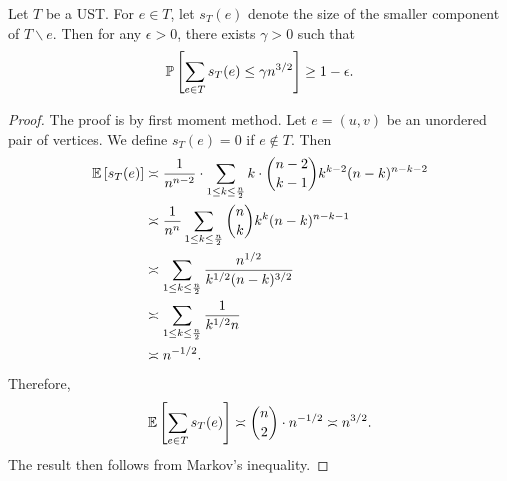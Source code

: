 \begin{lemma} \label{lem:conn:ust-structure-3}
  Let $T$ be a UST.
  For $e\in T$, let $s_T(e)$ denote the size of the smaller component of $T\backslash e$.
  Then for any $\epsilon>0$, there exists $\gamma>0$ such that
  \begin{align*}
    \mathbb{P}\left[ \sum_{e\in T} s_T(e) \le \gamma n^{3/2} \right] \ge 1-\epsilon.
  \end{align*}
\end{lemma}
\begin{proof}
  The proof is by first moment method.
  Let $e=(u,v)$ be an unordered pair of vertices.
  We define $s_T(e)=0$ if $e\not \in T$.
  Then
  \begin{align*}
    \mathbb{E} \left[s_T(e)\right] &\asymp \frac 1{n^{n-2}} \cdot \sum_{1\le k\le \frac n2} k \cdot \binom{n-2}{k-1} k^{k-2} (n-k)^{n-k-2} \\
    \nonumber &\asymp \frac 1{n^n} \sum_{1\le k\le \frac n2} \binom nk k^k (n-k)^{n-k-1} \\
    \nonumber &\asymp \sum_{1\le k\le \frac n2} \frac{n^{1/2}}{k^{1/2} (n-k)^{3/2}} \\
    \nonumber &\asymp \sum_{1\le k\le \frac n2} \frac{1}{k^{1/2} n} \\
    \nonumber &\asymp n^{-1/2}.
  \end{align*}
  Therefore,
  \begin{align*}
    \mathbb{E}\left[ \sum_{e\in T} s_T(e)\right] \asymp \binom n2 \cdot n^{-1/2} \asymp n^{3/2}.
  \end{align*}
  The result then follows from Markov's inequality.
\end{proof}

